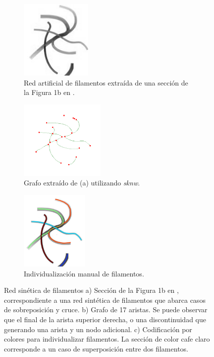  \begin{figure}[h!]
    \centering
    \begin{subfigure}[t]{0.3\textwidth}
        \centering
        \includegraphics[height=1.5in]{benchImages/define-weighted-4.png}
        \caption{Red artificial de filamentos extra\'ida de una secci\'on de la Figura 1b en \cite{breuer2015define}.}
        \label{fig:synth-Define-1b-original}
    \end{subfigure}%
    \hspace{0.5cm}
    \begin{subfigure}[t]{0.3\textwidth}
        \centering
        \includegraphics[height=1.5in]{benchImages/define-weighted-4_inv_graph_labeled_thick.png}
        \caption{Grafo extra\'ido de (a) utilizando {\it sknw}.}
        \label{fig:synth-Define-1b-graph}
    \end{subfigure}
    \hspace{0.5cm}
    \begin{subfigure}[t]{0.3\textwidth}
        \centering
        \includegraphics[height=1.5in]{benchImages/define-weighted-4-groundTruth.png}
        \caption{Individualizaci\'on manual de filamentos.}
        \label{fig:synth-Define-1b-graph-gt}
    \end{subfigure}
    \caption{Red sin\'etica de filamentos a) Secci\'on de la Figura 1b en \cite{breuer2015define}, correspondiente a una red sint\'etica de filamentos que abarca casos de sobreposici\'on y cruce. b) Grafo de 17 aristas. Se puede observar que el final de la arista superior derecha, o una discontinuidad que generando una arista y un nodo adicional. c) Codificaci\'on por colores para individualizar filamentos. La secci\'on de color cafe claro corresponde a un caso de superposici\'on entre dos filamentos.}
    \label{fig:synth-Define-1b}
\end{figure}

